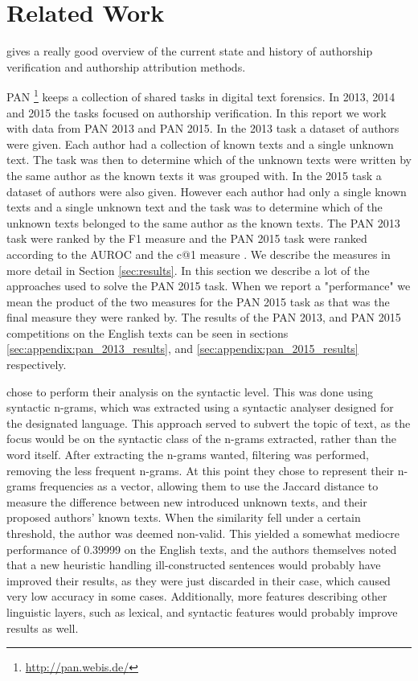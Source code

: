 \section{Related Work} \label{sec:related_work}
\cite{stamatos2009} gives a really good overview of the current state and
history of authorship verification and authorship attribution methods.

PAN \footnote{\url{http://pan.webis.de/}} keeps a collection of shared tasks in
digital text forensics. In 2013, 2014 and 2015 the tasks focused on authorship
verification. In this report we work with data from PAN 2013 and PAN 2015. In
the 2013 task a dataset of authors were given. Each author had a collection
of known texts and a single unknown text. The task was then to determine
which of the unknown texts were written by the same author as the known texts
it was grouped with. In the 2015 task a dataset of authors were also given.
However each author had only a single known texts and a single unknown text
and the task was to determine which of the unknown texts belonged to the same
author as the known texts. The PAN 2013 task were ranked by the F1 measure
and the PAN 2015 task were ranked according to the \gls{AUROC} and the c@1
measure \cite{penas2011}. We describe the measures in more detail in Section
\ref{sec:results}. In this section we describe a lot of the approaches used to
solve the PAN 2015 task. When we report a "performance" we mean the product
of the two measures for the PAN 2015 task as that was the final measure they
were ranked by. The results of the PAN 2013, and PAN 2015 competitions on the
English texts can be seen in sections \ref{sec:appendix:pan_2013_results}, and
\ref{sec:appendix:pan_2015_results} respectively.

\cite{juanpablo2015} chose to perform their analysis on the syntactic level.
This was done using syntactic n-grams, which was extracted using a syntactic
analyser designed for the designated language. This approach served to subvert
the topic of text, as the focus would be on the syntactic class of the n-grams
extracted, rather than the word itself. After extracting the n-grams wanted,
filtering was performed, removing the less frequent n-grams. At this point they
chose to represent their n-grams frequencies as a vector, allowing them to use
the Jaccard distance to measure the difference between new introduced unknown
texts, and their proposed authors' known texts. When the similarity fell under
a certain threshold, the author was deemed non-valid. This yielded a somewhat
mediocre performance of 0.39999 on the English texts, and the authors themselves
noted that a new heuristic handling ill-constructed sentences would probably
have improved their results, as they were just discarded in their case, which
caused very low accuracy in some cases. Additionally, more features describing
other linguistic layers, such as lexical, and syntactic features would probably
improve results as well.

